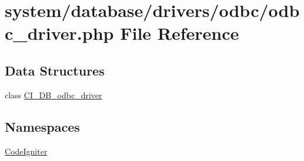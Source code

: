 \hypertarget{odbc__driver_8php}{}\section{system/database/drivers/odbc/odbc\+\_\+driver.php File Reference}
\label{odbc__driver_8php}
\subsection*{Data Structures}
\begin{DoxyCompactItemize}
\item 
class \mbox{\hyperlink{class_c_i___d_b__odbc__driver}{C\+I\+\_\+\+D\+B\+\_\+odbc\+\_\+driver}}
\end{DoxyCompactItemize}
\subsection*{Namespaces}
\begin{DoxyCompactItemize}
\item 
 \mbox{\hyperlink{namespace_code_igniter}{Code\+Igniter}}
\end{DoxyCompactItemize}
